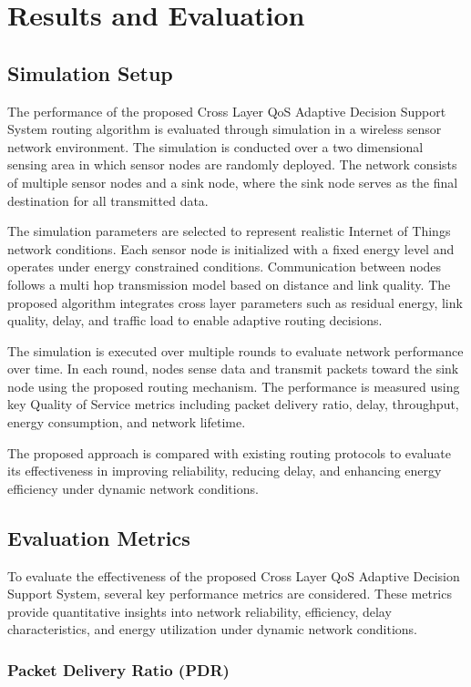 \documentclass[a4paper,fleqn]{cas-dc}
\numberwithin{equation}{section}
\begin{document}
\section{Results and Evaluation}
\subsection{Simulation Setup}

The performance of the proposed Cross Layer QoS Adaptive Decision Support System routing algorithm is evaluated through simulation in a wireless sensor network environment. The simulation is conducted over a two dimensional sensing area in which sensor nodes are randomly deployed. The network consists of multiple sensor nodes and a sink node, where the sink node serves as the final destination for all transmitted data.

The simulation parameters are selected to represent realistic Internet of Things network conditions. Each sensor node is initialized with a fixed energy level and operates under energy constrained conditions. Communication between nodes follows a multi hop transmission model based on distance and link quality. The proposed algorithm integrates cross layer parameters such as residual energy, link quality, delay, and traffic load to enable adaptive routing decisions.

The simulation is executed over multiple rounds to evaluate network performance over time. In each round, nodes sense data and transmit packets toward the sink node using the proposed routing mechanism. The performance is measured using key Quality of Service metrics including packet delivery ratio, delay, throughput, energy consumption, and network lifetime.

The proposed approach is compared with existing routing protocols to evaluate its effectiveness in improving reliability, reducing delay, and enhancing energy efficiency under dynamic network conditions.
\subsection{Evaluation Metrics}

To evaluate the effectiveness of the proposed Cross Layer QoS Adaptive Decision Support System, several key performance metrics are considered. These metrics provide quantitative insights into network reliability, efficiency, delay characteristics, and energy utilization under dynamic network conditions.

\subsubsection{Packet Delivery Ratio (PDR)}
\end{document}
